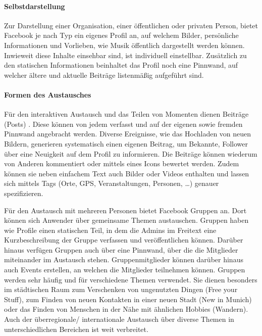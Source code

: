 \paragraph{Selbstdarstellung}

Zur Darstellung einer Organisation, einer öffentlichen oder privaten Person, bietet Facebook je nach Typ ein eigenes Profil an, auf welchem \ua Bilder, persönliche Informationen und Vorlieben, wie \zB Musik öffentlich dargestellt werden können. Inwieweit diese Inhalte einsehbar sind, ist individuell einstellbar. Zusätzlich zu den statischen Informationen beinhaltet das Profil noch eine Pinnwand, auf welcher ältere und aktuelle Beiträge listenmäßig aufgeführt sind.

\paragraph{Formen des Austausches}

Für den interaktiven Austausch und das Teilen von Momenten dienen Beiträge (Posts) . Diese können von jedem verfasst und auf der eigenen sowie fremden Pinnwand angebracht werden. Diverse Ereignisse, wie \bspw das Hochladen von neuen Bildern, generieren systematisch einen eigenen Beitrag, um Bekannte, Follower \etc über eine Neuigkeit auf dem Profil zu informieren. Die Beiträge können wiederum von Anderen kommentiert oder mittels eines Icons bewertet werden. Zudem können sie neben einfachem Text auch Bilder oder Videos enthalten und lassen sich mittels Tags (Orte, GPS, Veranstaltungen, Personen, \ldots) genauer spezifizieren.

Für den Austausch mit mehreren Personen bietet Facebook Gruppen an. Dort können sich Anwender über gemeinsame Themen austauschen. Gruppen haben wie Profile einen statischen Teil, in dem die Admins im Freitext eine Kurzbeschreibung der Gruppe verfassen und veröffentlichen können. Darüber hinaus verfügen Gruppen auch über eine Pinnwand, über die die Mitglieder miteinander im Austausch stehen. Gruppenmitglieder können darüber hinaus auch Events erstellen, an welchen die Mitglieder teilnehmen können.
Gruppen werden sehr häufig und für verschiedene Themen verwendet. Sie dienen besonders im städtischen Raum \bspw zum Verschenken von ungenutzten Dingen (Free your Stuff), zum Finden von neuen Kontakten in einer neuen Stadt (New in Munich) oder das Finden von Menschen in der Nähe mit ähnlichen Hobbies (\zB Wandern). Auch der überregionale/ internationale Austausch über diverse Themen in unterschiedlichen Bereichen ist weit verbreitet.

